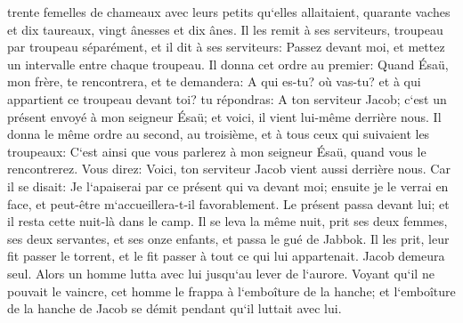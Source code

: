 \verse trente femelles de chameaux avec leurs petits qu`elles allaitaient, quarante vaches et dix taureaux, vingt ânesses et dix ânes. 
\verse Il les remit à ses serviteurs, troupeau par troupeau séparément, et il dit à ses serviteurs: Passez devant moi, et mettez un intervalle entre chaque troupeau. 
\verse Il donna cet ordre au premier: Quand Ésaü, mon frère, te rencontrera, et te demandera: A qui es-tu? où vas-tu? et à qui appartient ce troupeau devant toi? 
\verse tu répondras: A ton serviteur Jacob; c`est un présent envoyé à mon seigneur Ésaü; et voici, il vient lui-même derrière nous. 
\verse Il donna le même ordre au second, au troisième, et à tous ceux qui suivaient les troupeaux: C`est ainsi que vous parlerez à mon seigneur Ésaü, quand vous le rencontrerez. 
\verse Vous direz: Voici, ton serviteur Jacob vient aussi derrière nous. Car il se disait: Je l`apaiserai par ce présent qui va devant moi; ensuite je le verrai en face, et peut-être m`accueillera-t-il favorablement. 
\verse Le présent passa devant lui; et il resta cette nuit-là dans le camp. 
\verse Il se leva la même nuit, prit ses deux femmes, ses deux servantes, et ses onze enfants, et passa le gué de Jabbok. 
\verse Il les prit, leur fit passer le torrent, et le fit passer à tout ce qui lui appartenait. 
\verse Jacob demeura seul. Alors un homme lutta avec lui jusqu`au lever de l`aurore. 
\verse Voyant qu`il ne pouvait le vaincre, cet homme le frappa à l`emboîture de la hanche; et l`emboîture de la hanche de Jacob se démit pendant qu`il luttait avec lui. 
